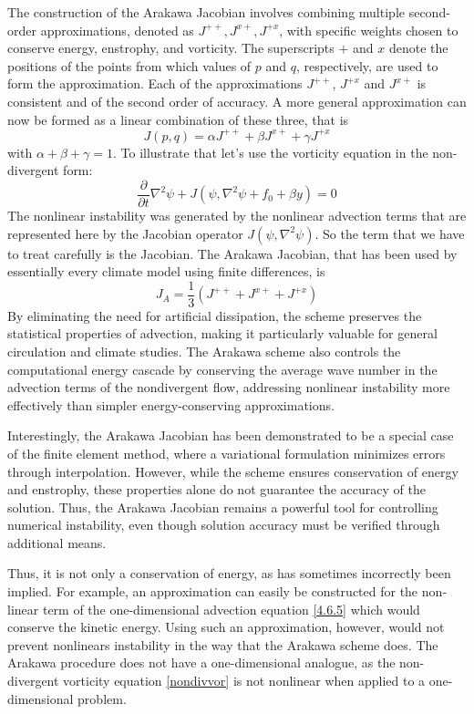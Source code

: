 The construction of the Arakawa Jacobian involves combining multiple second-order approximations, denoted as $J^{++},J^{x+},J^{+x}$, with specific weights chosen to conserve energy, enstrophy, and vorticity. 
The superscripts $+$ and $x$ denote the positions of the points from which values of $p$ and $q$, respectively, are used to form the approximation. Each of the approximations $J^{++}$, $J^{+x}$ and $J^{x+}$ is consistent and of the second order of accuracy. A more general approximation can now be formed as a linear combination of these three, that is
$$J(p,q)=\alpha J^{++}+\beta J^{x+}+\gamma J^{+x}$$ with $\alpha+\beta+\gamma=1$.
To illustrate that let's use the vorticity equation in the non-divergent form:
\begin{equation}\label{nondivvor}
    \frac{\partial}{\partial t}\nabla^2\psi+J(\psi, \nabla^2\psi+f_0+\beta y)=0
\end{equation}
The nonlinear instability was generated by the nonlinear advection terms that are represented here by the Jacobian operator $J(\psi, \nabla^2\psi)$. So the term that we have to treat carefully is the Jacobian. The Arakawa Jacobian, that has been used by essentially every climate model using finite differences, is
$$J_A=\frac{1}{3}\left(J^{++}+J^{x+}+ J^{+x}\right)$$
By eliminating the need for artificial dissipation, the scheme preserves the statistical properties of advection, making it particularly valuable for general circulation and climate studies. The Arakawa scheme also controls the computational energy cascade by conserving the average wave number in the advection terms of the nondivergent flow, addressing nonlinear instability more effectively than simpler energy-conserving approximations.

Interestingly, the Arakawa Jacobian has been demonstrated to be a special case of the finite element method, where a variational formulation minimizes errors through interpolation. However, while the scheme ensures conservation of energy and enstrophy, these properties alone do not guarantee the accuracy of the solution. Thus, the Arakawa Jacobian remains a powerful tool for controlling numerical instability, even though solution accuracy must be verified through additional means.



Thus, it is not only a conservation of energy, as has sometimes incorrectly been implied. For example, an approximation can easily be constructed for the non­linear term of the one-dimensional advection equation \ref{4.6.5} which would conserve the kinetic energy. Using such an approximation, however, would not prevent nonlinears instability in the way that the Arakawa scheme does. The Arakawa procedure does not have a one-dimensional analogue, as the non-divergent vorticity equation \ref{nondivvor} is not nonlinear when applied to a one-dimensional problem.


